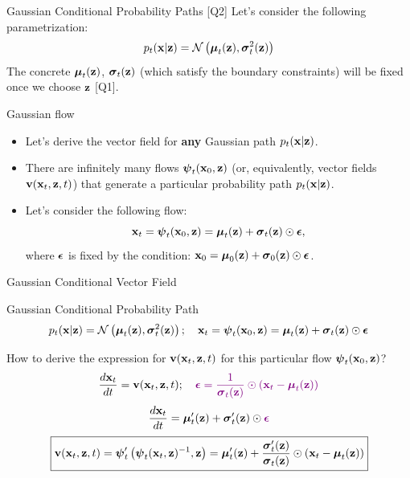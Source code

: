 \documentclass{beamer}
\begin{document}
\begin{frame}{Gaussian Conditional Probability Paths [Q2]}
	Let's consider the following parametrization:
	\vspace{-0.3cm}
	\[
		p_t(\mathbf{x} | \mathbf{z}) = \mathcal{N}\left(\boldsymbol{\mu}_t(\mathbf{z}), \boldsymbol{\sigma}_t^2(\mathbf{z}) \right)
	\]
	\eqpause
	The concrete $\boldsymbol{\mu}_t(\mathbf{z})$, $\boldsymbol{\sigma}_t(\mathbf{z})$ (which satisfy the boundary constraints) will be fixed once we choose $\mathbf{z}$ [Q1].
	\begin{block}{Gaussian flow}
		\begin{itemize}
			\item Let's derive the vector field for \textbf{any} Gaussian path $p_t(\mathbf{x} | \mathbf{z})$.
			\item There are infinitely many flows $\boldsymbol{\psi}_t(\mathbf{x}_0, \mathbf{z})$ (or, equivalently, vector fields $\mathbf{v}(\mathbf{x}_t, \mathbf{z}, t)$) that generate a particular probability path $p_t(\mathbf{x} | \mathbf{z})$.
			\eqpause
			\item Let's consider the following flow:
			\vspace{-0.3cm}
			\[
				\mathbf{x}_t = \boldsymbol{\psi}_t(\mathbf{x}_0, \mathbf{z}) = \boldsymbol{\mu}_t(\mathbf{z}) + \boldsymbol{\sigma}_t(\mathbf{z}) \odot \boldsymbol{\epsilon},
			\]
			where $\boldsymbol{\epsilon}$ is fixed by the condition: $\mathbf{x}_0 = \boldsymbol{\mu}_0(\mathbf{z}) + \boldsymbol{\sigma}_0(\mathbf{z}) \odot \boldsymbol{\epsilon}$.
		\end{itemize}
	\end{block}
\end{frame}
\begin{frame}{Gaussian Conditional Vector Field}
	\begin{block}{Gaussian Conditional Probability Path}
		\vspace{-0.5cm}
		\[
			p_t(\mathbf{x} | \mathbf{z}) = \mathcal{N}\left(\boldsymbol{\mu}_t(\mathbf{z}), \boldsymbol{\sigma}_t^2(\mathbf{z})\right); \quad \mathbf{x}_t = \boldsymbol{\psi}_t(\mathbf{x}_0, \mathbf{z}) = \boldsymbol{\mu}_t(\mathbf{z}) + \boldsymbol{\sigma}_t(\mathbf{z}) \odot \boldsymbol{\epsilon}
		\]
		\vspace{-0.5cm}
	\end{block}
	\eqpause
	How to derive the expression for $\mathbf{v}(\mathbf{x}_t, \mathbf{z}, t)$ for this particular flow $\boldsymbol{\psi}_t(\mathbf{x}_0, \mathbf{z})$?
	\eqpause
	\vspace{-0.3cm}
	\[
		\frac{d\mathbf{x}_t}{dt} = \mathbf{v}(\mathbf{x}_t, \mathbf{z}, t); \quad {\color{violet}\boldsymbol{\epsilon}= \frac{1}{\boldsymbol{\sigma}_t(\mathbf{z})} \odot (\mathbf{x}_t - \boldsymbol{\mu}_t(\mathbf{z}))}
	\]
	\eqpause
	\[
		\frac{d\mathbf{x}_t}{dt} = \boldsymbol{\mu}_t'(\mathbf{z}) + \boldsymbol{\sigma}_t'(\mathbf{z}) \odot {\color{violet}\boldsymbol{\epsilon}} 
	\]
	\eqpause
	\[
		\boxed{\mathbf{v}(\mathbf{x}_t, \mathbf{z}, t) = \boldsymbol{\psi}_t'\left(\boldsymbol{\psi}_t(\mathbf{x}_t, \mathbf{z})^{-1}, \mathbf{z}\right) = \boldsymbol{\mu}_t'(\mathbf{z}) + \frac{\boldsymbol{\sigma}_t'(\mathbf{z})}{\boldsymbol{\sigma}_t(\mathbf{z})} \odot (\mathbf{x}_t - \boldsymbol{\mu}_t(\mathbf{z}))}
	\]
\end{frame}
\end{document}
